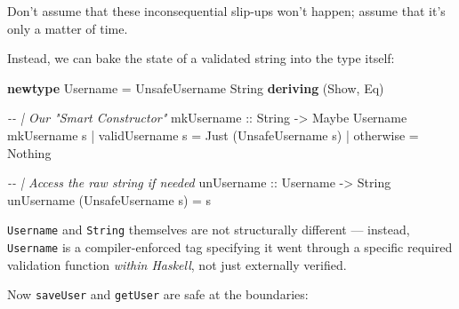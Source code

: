 \documentclass[]{article}
\newenvironment{Shaded}{}{}
\newcommand{\CommentTok}[1]{\textcolor[rgb]{0.38,0.63,0.69}{\textit{#1}}}
\newcommand{\DataTypeTok}[1]{\textcolor[rgb]{0.56,0.13,0.00}{#1}}
\newcommand{\FunctionTok}[1]{\textcolor[rgb]{0.02,0.16,0.49}{#1}}
\newcommand{\KeywordTok}[1]{\textcolor[rgb]{0.00,0.44,0.13}{\textbf{#1}}}
\newcommand{\NormalTok}[1]{#1}
\newcommand{\OperatorTok}[1]{\textcolor[rgb]{0.40,0.40,0.40}{#1}}
\newcommand{\OtherTok}[1]{\textcolor[rgb]{0.00,0.44,0.13}{#1}}
\begin{document}
Don't assume that these inconsequential slip-ups won't happen; assume that it's
only a matter of time.

Instead, we can bake the state of a validated string into the type itself:

\begin{Shaded}
\begin{Highlighting}[]
\KeywordTok{newtype} \DataTypeTok{Username} \OtherTok{=} \DataTypeTok{UnsafeUsername} \DataTypeTok{String}
  \KeywordTok{deriving}\NormalTok{ (}\DataTypeTok{Show}\NormalTok{, }\DataTypeTok{Eq}\NormalTok{)}

\CommentTok{{-}{-} | Our "Smart Constructor"}
\OtherTok{mkUsername ::} \DataTypeTok{String} \OtherTok{{-}\textgreater{}} \DataTypeTok{Maybe} \DataTypeTok{Username}
\NormalTok{mkUsername s}
  \OperatorTok{|}\NormalTok{ validUsername s }\OtherTok{=} \DataTypeTok{Just}\NormalTok{ (}\DataTypeTok{UnsafeUsername}\NormalTok{ s)}
  \OperatorTok{|} \FunctionTok{otherwise}       \OtherTok{=} \DataTypeTok{Nothing}

\CommentTok{{-}{-} | Access the raw string if needed}
\OtherTok{unUsername ::} \DataTypeTok{Username} \OtherTok{{-}\textgreater{}} \DataTypeTok{String}
\NormalTok{unUsername (}\DataTypeTok{UnsafeUsername}\NormalTok{ s) }\OtherTok{=}\NormalTok{ s}
\end{Highlighting}
\end{Shaded}

\texttt{Username} and \texttt{String} themselves are not structurally different
--- instead, \texttt{Username} is a compiler-enforced tag specifying it went
through a specific required validation function \emph{within Haskell}, not just
externally verified.

Now \texttt{saveUser} and \texttt{getUser} are safe at the boundaries:
\end{document}
